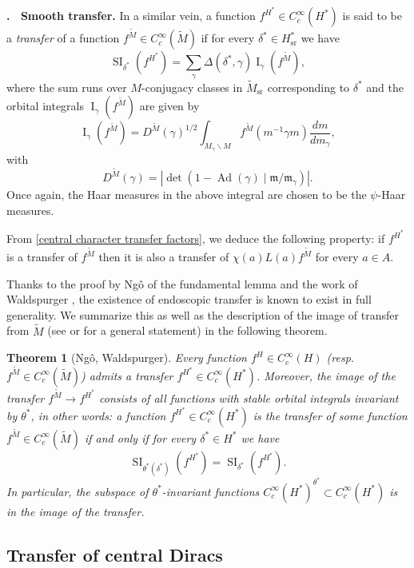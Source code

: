\documentclass[12pt]{article}
\newenvironment{paragr}[1][]{\refstepcounter{subsubsection} \noindent \textbf{\thesubsubsection . \ #1}}{\medskip}
\newtheorem{theo}{Theorem}[section]
\numberwithin{equation}{section}
\def\tM{\widetilde{M}}
\DeclareMathOperator{\Ad}{Ad}
\DeclareMathOperator{\sr}{sr}
\DeclareMathOperator{\SI}{\mathrm{SI}}
\DeclareMathOperator{\rI}{\mathrm{I}}
\begin{document}
\begin{paragr}[Smooth transfer.]
		In a similar vein, a function $f^{H^*}\in C_c^\infty(H^*)$ is said to be a {\em transfer} of a function $f^{\tM}\in C_c^\infty(\tM)$ if for every $\delta^*\in H^*_{\sr}$ we have
		$$\displaystyle \SI_{\delta^*}(f^{H^*})=\sum_{\gamma} \Delta(\delta^*,\gamma) \rI_\gamma(f^{\tM}),$$
		where the sum runs over $M$-conjugacy classes in $\tM_{\sr}$ corresponding to $\delta^*$ and the orbital integrals $\rI_\gamma(f^{\tM})$ are given by
		$$\displaystyle \rI_\gamma(f^{\tM})=D^{\tM}(\gamma)^{1/2}\int_{M_\gamma\backslash M} f^{\tM}(m^{-1}\gamma m) \frac{dm}{dm_\gamma},$$
		with
		$$\displaystyle D^{\tM}(\gamma)=\left\lvert \det(1-\Ad(\gamma)\mid \mathfrak{m}/\mathfrak{m}_\gamma)\right\rvert.$$
		Once again, the Haar measures in the above integral are chosen to be the $\psi$-Haar measures.
		
		From \eqref{central character transfer factors}, we deduce the following property: if $f^{H^*}$ is a transfer of $f^{\tM}$ then it is also a transfer of $\chi(a)L(a)f^{\tM}$ for every $a\in A$.
		
		Thanks to the proof by Ng\^o of the fundamental lemma \cite{Ngo} and the work of Waldspurger \cite{Walchgtcar} \cite{Waldendtordue}, the existence of endoscopic transfer is known to exist in full generality. We summarize this as well as the description of the image of transfer from $\tM$ (see \cite[Corollary 2.1.2]{artbook} or \cite[proposition I.4.11]{MWStab1} for a general statement) in the following theorem.
		
		\begin{theo}[Ng\^o, Waldspurger]\label{prop image transfer}
			Every function $f^H\in C_c^\infty(H)$ (resp. $f^{\tM}\in C_c^\infty(\tM)$) admits a transfer $f^{H^*}\in C_c^\infty(H^*)$. Moreover, the image of the transfer $f^{\tM}\to f^{H^*}$ consists of all functions with stable orbital integrals invariant by $\theta^*$, in other words: a function $f^{H^*}\in C_c^\infty(H^*)$ is the transfer of some function $f^{\tM}\in C_c^\infty(\tM)$ if and only if for every $\delta^*\in H^*$ we have
			$$\SI_{\theta^*(\delta^*)}(f^{H^*})=\SI_{\delta^*}(f^{H^*}).$$
			In particular, the subspace of $\theta^*$-invariant functions $C_c^\infty(H^*)^{\theta^*}\subset C_c^\infty(H^*)$ is in the image of the transfer.
		\end{theo}
		
	\end{paragr}
	
	
	
	\subsection{Transfer of central Diracs}\label{Sect transfer dirac}
	
\end{document}
